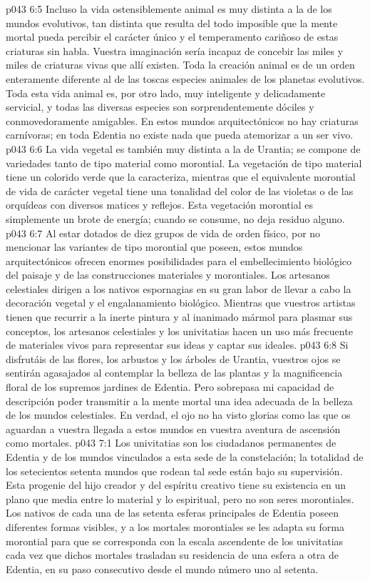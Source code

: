 \vs p043 6:5 Incluso la vida ostensiblemente animal es muy distinta a la de los mundos evolutivos, tan distinta que resulta del todo imposible que la mente mortal pueda percibir el carácter único y el temperamento cariñoso de estas criaturas sin habla. Vuestra imaginación sería incapaz de concebir las miles y miles de criaturas vivas que allí existen. Toda la creación animal es de un orden enteramente diferente al de las toscas especies animales de los planetas evolutivos. Toda esta vida animal es, por otro lado, muy inteligente y delicadamente servicial, y todas las diversas especies son sorprendentemente dóciles y conmovedoramente amigables. En estos mundos arquitectónicos no hay criaturas carnívoras; en toda Edentia no existe nada que pueda atemorizar a un ser vivo.
\vs p043 6:6 La vida vegetal es también muy distinta a la de Urantia; se compone de variedades tanto de tipo material como morontial. La vegetación de tipo material tiene un colorido verde que la caracteriza, mientras que el equivalente morontial de vida de carácter vegetal tiene una tonalidad del color de las violetas o de las orquídeas con diversos matices y reflejos. Esta vegetación morontial es simplemente un brote de energía; cuando se consume, no deja residuo alguno.
\vs p043 6:7 Al estar dotados de diez grupos de vida de orden físico, por no mencionar las variantes de tipo morontial que poseen, estos mundos arquitectónicos ofrecen enormes posibilidades para el embellecimiento biológico del paisaje y de las construcciones materiales y morontiales. Los artesanos celestiales dirigen a los nativos espornagias en su gran labor de llevar a cabo la decoración vegetal y el engalanamiento biológico. Mientras que vuestros artistas tienen que recurrir a la inerte pintura y al inanimado mármol para plasmar sus conceptos, los artesanos celestiales y los univitatias hacen un uso más frecuente de materiales vivos para representar sus ideas y captar sus ideales.
\vs p043 6:8 Si disfrutáis de las flores, los arbustos y los árboles de Urantia, vuestros ojos se sentirán agasajados al contemplar la belleza de las plantas y la magnificencia floral de los supremos jardines de Edentia. Pero sobrepasa mi capacidad de descripción poder transmitir a la mente mortal una idea adecuada de la belleza de los mundos celestiales. En verdad, el ojo no ha visto glorias como las que os aguardan a vuestra llegada a estos mundos en vuestra aventura de ascensión como mortales.
\vs p043 7:1 Los univitatias son los ciudadanos permanentes de Edentia y de los mundos vinculados a esta sede de la constelación; la totalidad de los setecientos setenta mundos que rodean tal sede están bajo su supervisión. Esta progenie del hijo creador y del espíritu creativo tiene su existencia en un plano que media entre lo material y lo espiritual, pero no son seres morontiales. Los nativos de cada una de las setenta esferas principales de Edentia poseen diferentes formas visibles, y a los mortales morontiales se les adapta su forma morontial para que se corresponda con la escala ascendente de los univitatias cada vez que dichos mortales trasladan su residencia de una esfera a otra de Edentia, en su paso consecutivo desde el mundo número uno al setenta.
